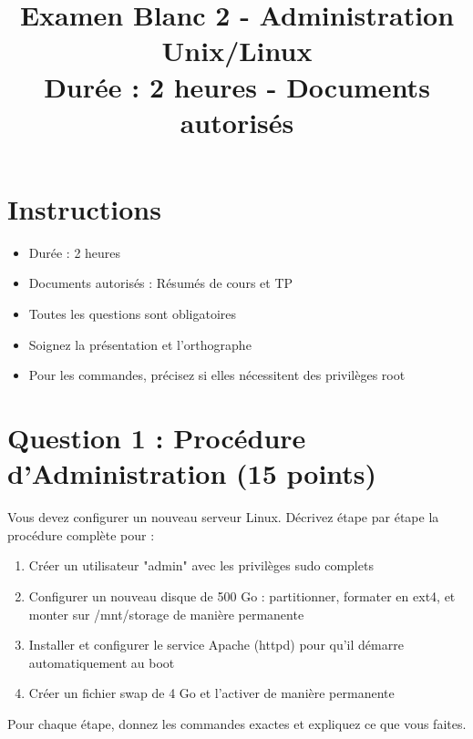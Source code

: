 \documentclass[12pt,a4paper]{article}
\title{\textbf{Examen Blanc 2 - Administration Unix/Linux}\\
\large Durée : 2 heures - Documents autorisés}
\author{}
\date{}
\begin{document}
\maketitle
\thispagestyle{fancy}

\section*{Instructions}
\begin{itemize}
    \item Durée : 2 heures
    \item Documents autorisés : Résumés de cours et TP
    \item Toutes les questions sont obligatoires
    \item Soignez la présentation et l'orthographe
    \item Pour les commandes, précisez si elles nécessitent des privilèges root
\end{itemize}

\newpage


\section{Question 1 : Procédure d'Administration (15 points)}

\begin{questionbox}
Vous devez configurer un nouveau serveur Linux. Décrivez étape par étape la procédure complète pour :

\begin{enumerate}
    \item Créer un utilisateur "admin" avec les privilèges sudo complets
    \item Configurer un nouveau disque de 500 Go : partitionner, formater en ext4, et monter sur /mnt/storage de manière permanente
    \item Installer et configurer le service Apache (httpd) pour qu'il démarre automatiquement au boot
    \item Créer un fichier swap de 4 Go et l'activer de manière permanente
\end{enumerate}

Pour chaque étape, donnez les commandes exactes et expliquez ce que vous faites.
\end{questionbox}
\end{document}
